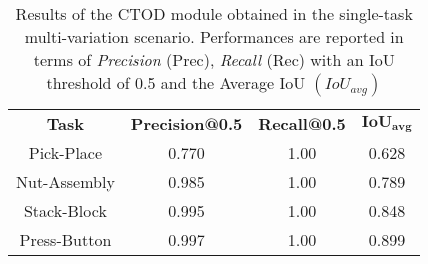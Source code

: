 




\begin{table}[t]
    \centering
    \caption{Results of the CTOD module obtained in the single-task multi-variation scenario. Performances are reported in terms of \textit{Precision} (Prec), \textit{Recall} (Rec) with an IoU threshold of 0.5 and the Average IoU $(IoU_{avg})$ }
    \label{table:ctod_single_task_performance}
    \begin{tabular}{|c|c|c|c|} 
    \hline
    \textbf{Task} & \textbf{Precision@0.5} & \textbf{Recall@0.5} & $\mathbf{IoU_{avg}}$ \\ 
    \hhline{|====|}
    Pick-Place & 0.770 & 1.00 & 0.628 \\ 
    \hline
    Nut-Assembly & 0.985 & 1.00 & 0.789 \\ 
    \hline
    Stack-Block & 0.995 & 1.00 & 0.848 \\ 
    \hline
    Press-Button & 0.997 & 1.00 & 0.899 \\
    \hline
    \end{tabular}
    \end{table}

